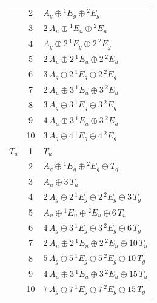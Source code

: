 \documentclass[11pt]{article}
\begin{document}
\begin{longtable}{l c p{}}
 & 2 & $A_{g}\oplus {}^{1}E_{g}\oplus {}^{2}E_{g}$\\
 & 3 & $2\,A_{u}\oplus {}^{1}E_{u}\oplus {}^{2}E_{u}$\\
 & 4 & $A_{g}\oplus 2\,{}^{1}E_{g}\oplus 2\,{}^{2}E_{g}$\\
 & 5 & $2\,A_{u}\oplus 2\,{}^{1}E_{u}\oplus 2\,{}^{2}E_{u}$\\
 & 6 & $3\,A_{g}\oplus 2\,{}^{1}E_{g}\oplus 2\,{}^{2}E_{g}$\\
 & 7 & $2\,A_{u}\oplus 3\,{}^{1}E_{u}\oplus 3\,{}^{2}E_{u}$\\
 & 8 & $3\,A_{g}\oplus 3\,{}^{1}E_{g}\oplus 3\,{}^{2}E_{g}$\\
 & 9 & $4\,A_{u}\oplus 3\,{}^{1}E_{u}\oplus 3\,{}^{2}E_{u}$\\
 & 10 & $3\,A_{g}\oplus 4\,{}^{1}E_{g}\oplus 4\,{}^{2}E_{g}$\\
\hline
$T_{u}$ & 1 & $T_{u}$\\
 & 2 & $A_{g}\oplus {}^{1}E_{g}\oplus {}^{2}E_{g}\oplus T_{g}$\\
 & 3 & $A_{u}\oplus 3\,T_{u}$\\
 & 4 & $2\,A_{g}\oplus 2\,{}^{1}E_{g}\oplus 2\,{}^{2}E_{g}\oplus 3\,T_{g}$\\
 & 5 & $A_{u}\oplus {}^{1}E_{u}\oplus {}^{2}E_{u}\oplus 6\,T_{u}$\\
 & 6 & $4\,A_{g}\oplus 3\,{}^{1}E_{g}\oplus 3\,{}^{2}E_{g}\oplus 6\,T_{g}$\\
 & 7 & $2\,A_{u}\oplus 2\,{}^{1}E_{u}\oplus 2\,{}^{2}E_{u}\oplus 10\,T_{u}$\\
 & 8 & $5\,A_{g}\oplus 5\,{}^{1}E_{g}\oplus 5\,{}^{2}E_{g}\oplus 10\,T_{g}$\\
 & 9 & $4\,A_{u}\oplus 3\,{}^{1}E_{u}\oplus 3\,{}^{2}E_{u}\oplus 15\,T_{u}$\\
 & 10 & $7\,A_{g}\oplus 7\,{}^{1}E_{g}\oplus 7\,{}^{2}E_{g}\oplus 15\,T_{g}$\\
\hline
\end{longtable}
\end{document}

